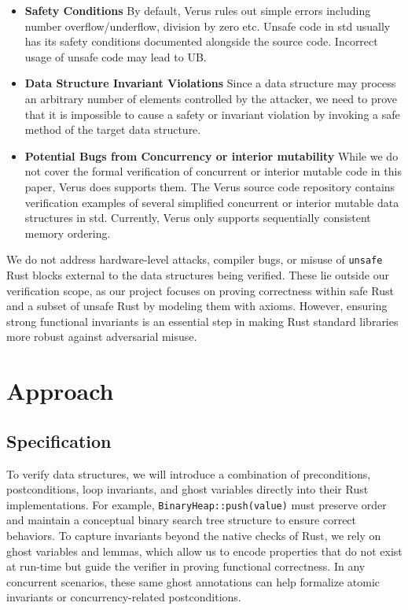 \documentclass[conference]{IEEEtran}
\begin{document}
\begin{itemize}
\item \textbf{Safety Conditions} By default, Verus rules out simple errors including number overflow/underflow, division by zero etc. Unsafe code in std usually has its safety conditions documented alongside the source code. Incorrect usage of unsafe code may lead to UB. 
\item \textbf{Data Structure Invariant Violations} Since a data structure may process an arbitrary number of elements controlled by the attacker, we need to prove that it is impossible to cause a safety or invariant violation by invoking a safe method of the target data structure.  
\item \textbf{Potential Bugs from Concurrency or interior mutability} While we do not cover the formal verification of concurrent or interior mutable code in this paper, Verus does supports them. The Verus source code repository contains verification examples of several simplified concurrent or interior mutable data structures in std. Currently, Verus only supports sequentially consistent memory ordering. 
\end{itemize}

We do not address hardware-level attacks, compiler bugs, or misuse of \texttt{unsafe} Rust blocks external to the data structures being verified. These lie outside our verification scope, as our project focuses on proving correctness within safe Rust and a subset of unsafe Rust by modeling them with axioms. However, ensuring strong functional invariants is an essential step in making Rust standard libraries more robust against adversarial misuse.

\section{Approach}

\subsection{Specification}
To verify data structures, we will introduce a combination of preconditions, postconditions, loop invariants, and ghost variables directly into their Rust implementations. For example, \texttt{BinaryHeap::push(value)} must preserve order and maintain a conceptual binary search tree structure to ensure correct behaviors. To capture invariants beyond the native checks of Rust, we rely on ghost variables and lemmas, which allow us to encode properties that do not exist at run-time but guide the verifier in proving functional correctness. In any concurrent scenarios, these same ghost annotations can help formalize atomic invariants or concurrency-related postconditions.
\end{document}
